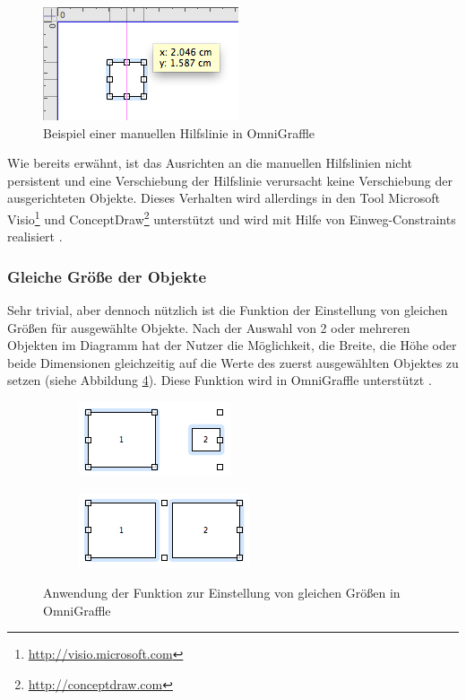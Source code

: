 \begin{figure}[hbt]
    \centering
    \includegraphics{resources/omnigraffle-manual-guides.png}
    \caption{Beispiel einer manuellen Hilfslinie in OmniGraffle}
    \label{fig:omnigraffle-manual-guides}
\end{figure}

Wie bereits erwähnt, ist das Ausrichten an die manuellen Hilfslinien nicht persistent und eine Verschiebung der Hilfslinie verursacht keine Verschiebung der ausgerichteten Objekte. Dieses Verhalten wird allerdings in den Tool Microsoft Visio\footnote{\url{http://visio.microsoft.com}} und ConceptDraw\footnote{\url{http://conceptdraw.com}} unterstützt und wird mit Hilfe von Einweg-Constraints realisiert \cite[S.20]{Maier12A-Pattern-based}.

\subsubsection{Gleiche Größe der Objekte}

Sehr trivial, aber dennoch nützlich ist die Funktion der Einstellung von gleichen Größen für ausgewählte Objekte. Nach der Auswahl von 2 oder mehreren Objekten im Diagramm hat der Nutzer die Möglichkeit, die Breite, die Höhe oder beide Dimensionen gleichzeitig auf die Werte des zuerst ausgewählten Objektes zu setzen (siehe Abbildung \ref{fig:omnigraffle-make-same-size}). Diese Funktion wird in OmniGraffle unterstützt \cite{Olsen10OmniGraffle}.

\begin{figure}[hbt]
    \newcommand{\subfigurewidth}{0.5\textwidth}
    \begin{subfigure}{\subfigurewidth}
        \centering
        \includegraphics{resources/omnigraffle-make-same-size-a}
        \caption{}
        \label{fig:omnigraffle-make-same-size-a}
    \end{subfigure}
    \begin{subfigure}{\subfigurewidth}
        \centering
        \includegraphics{resources/omnigraffle-make-same-size-b}
        \caption{}
        \label{fig:omnigraffle-make-same-size-b}
    \end{subfigure}
    \caption{Anwendung der Funktion zur Einstellung von gleichen Größen in OmniGraffle}
    \label{fig:omnigraffle-make-same-size}
\end{figure}

